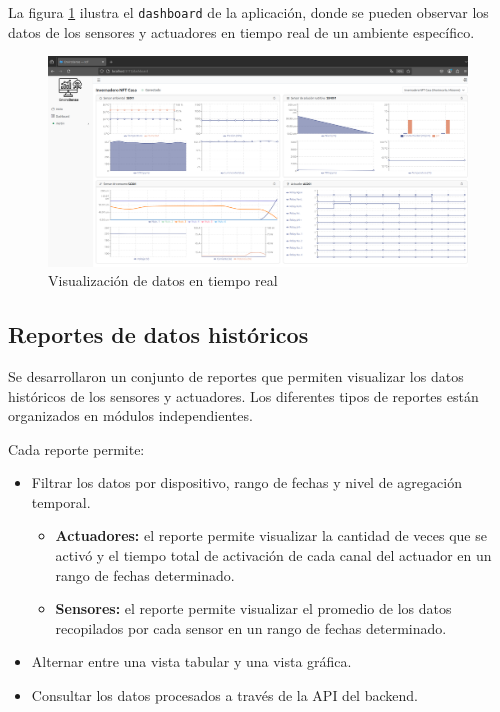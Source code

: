 La figura \ref{fig:dashboard} ilustra el \texttt{dashboard} de la aplicación,
donde se pueden observar los datos de los sensores y actuadores en tiempo real
de un ambiente específico.

\begin{figure}[H]
    \centering
    \includegraphics[width=0.99\textwidth]{./Images/27_dashboard.png}
    \caption{Visualización de datos en tiempo real}
    \label{fig:dashboard}
\end{figure}

\subsection{Reportes de datos históricos}

Se desarrollaron un conjunto de reportes que permiten visualizar los datos
históricos de los sensores y actuadores. Los diferentes tipos de reportes están
organizados en módulos independientes.

Cada reporte permite:
\begin{itemize}
    \item Filtrar los datos por dispositivo, rango de fechas y nivel de agregación
          temporal.
          \begin{itemize}
              \item \textbf{Actuadores:} el reporte permite visualizar la cantidad de veces que
                    se activó y el tiempo total de activación de cada canal del actuador en un
                    rango de fechas determinado.
              \item \textbf{Sensores:} el reporte permite visualizar el promedio de los datos
                    recopilados por cada sensor en un rango de fechas determinado.
          \end{itemize}
    \item Alternar entre una vista tabular y una vista gráfica.
    \item Consultar los datos procesados a través de la API del backend.
\end{itemize}

